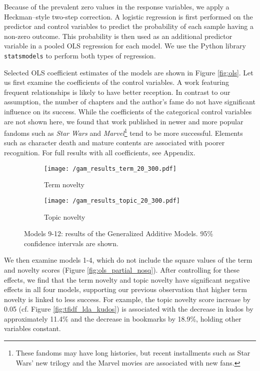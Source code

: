 \documentclass[letterpaper]{article} %
\begin{document}
Because of the prevalent zero values in the response variables, we apply a Heckman--style two-step correction. A logistic regression is first performed on the predictor and control variables to predict the probability of each sample having a non-zero outcome. This probability is then used as an additional predictor variable in a pooled OLS regression for each model. We use the Python library \texttt{statsmodels} \cite{seabold2010statsmodels} to perform both types of regression.

Selected OLS coefficient estimates of the models are shown in Figure \ref{fig:ols}. Let us first examine the coefficients of the control variables. A work featuring frequent relationships is likely to have better reception. In contrast to our assumption, the number of chapters and the author's fame do not have significant influence on its success. While the coefficients of the categorical control variables are not shown here, we found that work published in newer and more popular fandoms such as \emph{Star Wars} and \emph{Marvel}\footnote{These fandoms may have long histories, but recent installments such as Star Wars' new trilogy and the Marvel movies are associated with new fans.} tend to be more successful. Elements such as character death and mature contents are associated with poorer recognition. For full results with all coefficients, see Appendix.

\begin{figure*}
\vspace{-1cm}
    \centering
    \begin{subfigure}{\textwidth}
          \texttt{[image: /gam\_results\_term\_20\_300.pdf]}
  		\caption{Term novelty} 
			\label{fig:gam_term}
       \end{subfigure}
      \begin{subfigure}{\textwidth}
          \texttt{[image: /gam\_results\_topic\_20\_300.pdf]}
		\caption{Topic novelty} 
		\label{fig:gam_topic}
       \end{subfigure}
           	\caption{Models 9-12: results of the Generalized Additive Models. 95\% confidence intervals are shown.}
        \label{fig:gam}
\end{figure*}


We then examine models 1-4, which do not include the square values of the term and novelty scores (Figure \ref{fig:ols_partial_nosq}). After controlling for these effects, we find that the term novelty and topic novelty have significant negative effects in all four models, supporting our previous observation that higher term novelty is linked to less success. For example, the topic novelty score increase by 0.05 (cf. Figure \ref{fig:tfidf_lda_kudos}) is associated with the decrease in kudos by approximately 11.4\% and the decrease in bookmarks by 18.9\%, holding other variables constant. 
\end{document}
